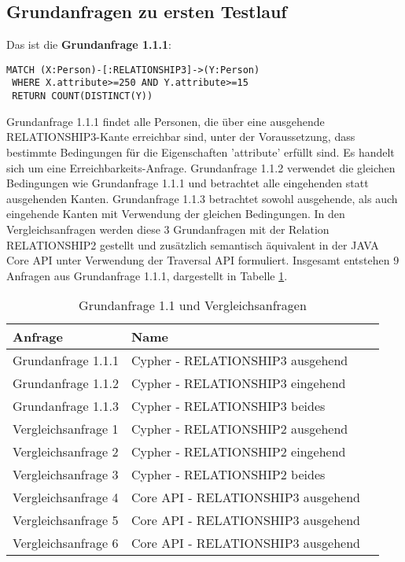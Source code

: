 \subsection{Grundanfragen zu ersten Testlauf}
Das ist die \textbf{Grundanfrage 1.1.1}: 
\begin{Verbatim}[frame=single]
 MATCH (X:Person)-[:RELATIONSHIP3]->(Y:Person) 
 WHERE X.attribute>=250 AND Y.attribute>=15  
 RETURN COUNT(DISTINCT(Y))
\end{Verbatim} 
Grundanfrage 1.1.1 findet alle Personen, die über eine ausgehende RELATIONSHIP3-Kante erreichbar sind, unter der Voraussetzung, dass bestimmte Bedingungen für die Eigenschaften 'attribute' erfüllt sind. Es handelt sich um eine Erreichbarkeits-Anfrage.
Grundanfrage 1.1.2 verwendet die gleichen Bedingungen wie Grundanfrage 1.1.1 und betrachtet alle eingehenden statt ausgehenden Kanten. Grundanfrage 1.1.3 betrachtet sowohl ausgehende, als auch eingehende Kanten mit Verwendung der gleichen Bedingungen. In den Vergleichsanfragen werden diese 3 Grundanfragen mit der Relation RELATIONSHIP2 gestellt und zusätzlich semantisch äquivalent in der JAVA Core API unter Verwendung der Traversal API formuliert. Insgesamt entstehen 9 Anfragen aus Grundanfrage 1.1.1, dargestellt in Tabelle \ref{tab:Intro_Query2_1}.
\FloatBarrier
\begin{table}[h]
	\centering
	\begin{tabular}{ |p{5cm}||p{7cm}|p{3cm}  }
		\hline
		Anfrage& Name\\
		\hline
		Grundanfrage 1.1.1 &  Cypher - RELATIONSHIP3 ausgehend\\
		Grundanfrage 1.1.2 &  Cypher - RELATIONSHIP3 eingehend\\
		Grundanfrage 1.1.3 &  Cypher - RELATIONSHIP3 beides\\
		Vergleichsanfrage 1 &  Cypher - RELATIONSHIP2 ausgehend\\
		Vergleichsanfrage 2 &  Cypher - RELATIONSHIP2 eingehend\\
		Vergleichsanfrage 3 &  Cypher - RELATIONSHIP2 beides\\
		Vergleichsanfrage 4 &  Core API - RELATIONSHIP3 ausgehend\\
		Vergleichsanfrage 5 &  Core API - RELATIONSHIP3 ausgehend\\
		Vergleichsanfrage 6 &  Core API - RELATIONSHIP3 ausgehend\\
		\hline
	\end{tabular}
	\caption{Grundanfrage 1.1 und Vergleichsanfragen}
	\label{tab:Intro_Query2_1}
\end{table}
\FloatBarrier


